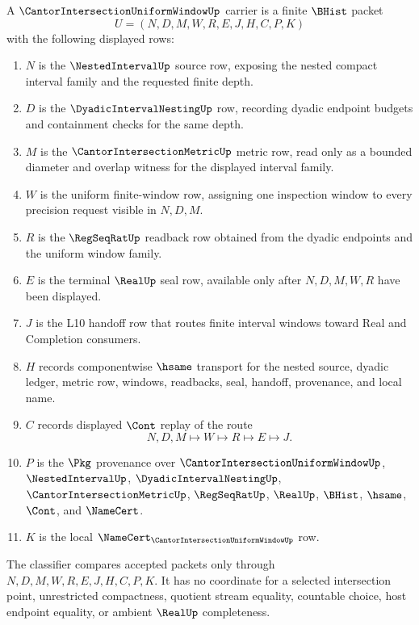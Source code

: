 \begin{definition}
\label{def:cantor-intersection-uniform-window-carrier}
A $\CantorIntersectionUniformWindowUp$ carrier is a finite $\BHist$ packet
$$
U=(N,D,M,W,R,E,J,H,C,P,K)
$$
with the following displayed rows:
\begin{enumerate}
\item $N$ is the $\NestedIntervalUp$ source row, exposing the nested compact interval family and the requested finite depth.
\item $D$ is the $\DyadicIntervalNestingUp$ row, recording dyadic endpoint budgets and containment checks for the same depth.
\item $M$ is the $\CantorIntersectionMetricUp$ metric row, read only as a bounded diameter and overlap witness for the displayed interval family.
\item $W$ is the uniform finite-window row, assigning one inspection window to every precision request visible in $N,D,M$.
\item $R$ is the $\RegSeqRatUp$ readback row obtained from the dyadic endpoints and the uniform window family.
\item $E$ is the terminal $\RealUp$ seal row, available only after $N,D,M,W,R$ have been displayed.
\item $J$ is the L10 handoff row that routes finite interval windows toward Real and Completion consumers.
\item $H$ records componentwise $\hsame$ transport for the nested source, dyadic ledger, metric row, windows, readbacks, seal, handoff, provenance, and local name.
\item $C$ records displayed $\Cont$ replay of the route
$$
N,D,M \longmapsto W \longmapsto R \longmapsto E \longmapsto J .
$$
\item $P$ is the $\Pkg$ provenance over $\CantorIntersectionUniformWindowUp$, $\NestedIntervalUp$, $\DyadicIntervalNestingUp$, $\CantorIntersectionMetricUp$, $\RegSeqRatUp$, $\RealUp$, $\BHist$, $\hsame$, $\Cont$, and $\NameCert$.
\item $K$ is the local $\NameCert_{\CantorIntersectionUniformWindowUp}$ row.
\end{enumerate}
The classifier compares accepted packets only through $N,D,M,W,R,E,J,H,C,P,K$. It has no coordinate for a selected intersection point, unrestricted compactness, quotient stream equality, countable choice, host endpoint equality, or ambient $\RealUp$ completeness.
\end{definition}

